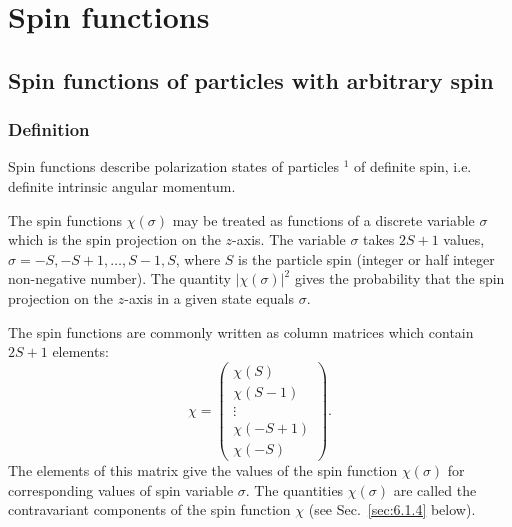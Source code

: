 \chapter{Spin functions}\label{chap:6}
\section{Spin functions of particles with arbitrary spin}\label{sec:6.1}
\subsection{Definition}\label{sec:6.1.1}
Spin functions describe polarization states of particles ${ }^{1}$ of definite spin, i.e. definite intrinsic angular momentum.

The spin functions $\chi(\sigma)$ may be treated as functions of a discrete variable $\sigma$ which is the spin projection on the $z$-axis. The variable $\sigma$ takes $2 S+1$ values, $\sigma=-S,-S+1, \ldots, S-1, S$, where $S$ is the particle spin (integer or half integer non-negative number). The quantity $|\chi(\sigma)|^{2}$ gives the probability that the spin projection on the $z$-axis in a given state equals $\sigma$.

The spin functions are commonly written as column matrices which contain $2 S+1$ elements:
\begin{equation}
\chi=\begin{pmatrix}
\chi(S)  \\
\chi(S-1) \\
\vdots \\
\chi(-S+1) \\
\chi(-S)
\end{pmatrix}. \label{eq:6:1:1}
\end{equation}
The elements of this matrix give the values of the spin function $\chi(\sigma)$ for corresponding values of spin variable $\sigma$. The quantities $\chi(\sigma)$ are called the contravariant components of the spin function $\chi$ (see Sec.~\ref{sec:6.1.4} below).


